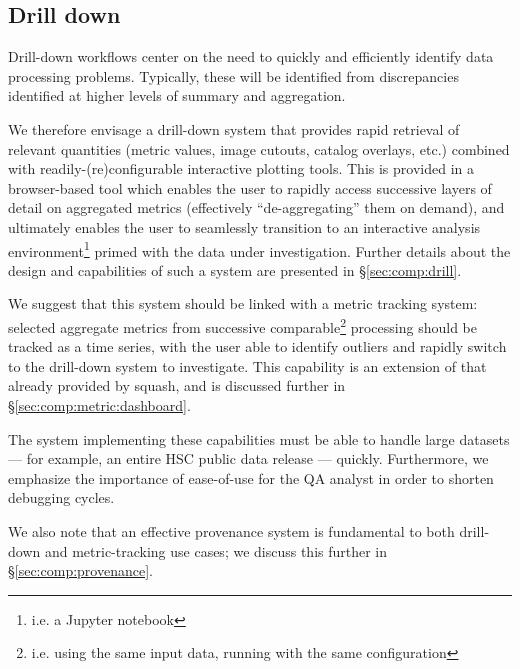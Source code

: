 \subsection{Drill down}
\label{sec:design:drill}

Drill-down workflows center on the need to quickly and efficiently identify
data processing problems. Typically, these will be identified from
discrepancies identified at higher levels of summary and aggregation.

We therefore envisage a drill-down system that provides rapid retrieval of
relevant quantities (metric values, image cutouts, catalog overlays, etc.)
combined with readily-(re)configurable interactive plotting tools. This is
provided in a browser-based tool which enables the user to rapidly access
successive layers of detail on aggregated metrics (effectively
``de-aggregating'' them on demand), and ultimately enables the user to
seamlessly transition to an interactive analysis environment\footnote{i.e. a
Jupyter notebook} primed with the data under investigation. Further details
about the design and capabilities of such a system are presented in
\S\ref{sec:comp:drill}.

We suggest that this system should be linked with a metric tracking system:
selected \glspl{aggregate metric} from successive comparable\footnote{i.e.
using the same input data, running with the same configuration} processing
should be tracked as a time series, with the user able to identify outliers
and rapidly switch to the drill-down system to investigate. This capability is
an extension of that already provided by \gls{squash}, and is discussed
further in \S\ref{sec:comp:metric:dashboard}.

The system implementing these capabilities must be able to handle large
datasets --- for example, an entire HSC public data release --- quickly.
Furthermore, we emphasize the importance of ease-of-use for the QA analyst in
order to shorten debugging cycles.

We also note that an effective \gls{provenance} system is fundamental to
both drill-down and metric-tracking use cases; we discuss this further in
\S\ref{sec:comp:provenance}.
